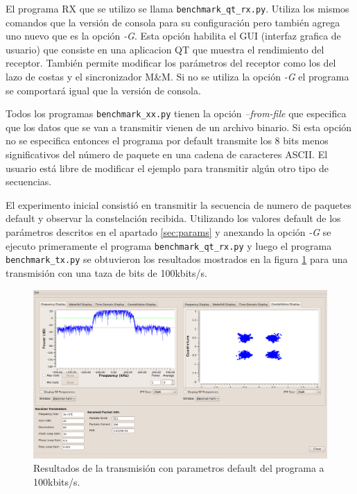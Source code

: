 El programa RX que se utilizo se llama \verb|benchmark_qt_rx.py|. Utiliza los mismos comandos que la
versi\'on de consola para su configuraci\'on pero tambi\'en agrega uno nuevo que es la opci\'on
\emph{-G}. Esta opci\'on habilita el GUI (interfaz grafica de usuario) que consiste en una
aplicacion QT que muestra el rendimiento del receptor. Tambi\'en permite modificar los par\'ametros
del receptor como los del lazo de costas y el sincronizador M\&M. Si no se utiliza la opci\'on
\emph{-G} el programa se comportar\'a igual que la versi\'on de consola.

Todos los programas \verb|benchmark_xx.py| tienen la opci\'on \emph{--from-file} que especifica que
los datos que se van a transmitir vienen de un archivo binario. Si esta opci\'on no se especifica
entonces el programa por default transmite los 8 bits menos significativos del n\'umero de paquete
en una cadena de caracteres ASCII. El usuario est\'a libre de modificar el ejemplo para transmitir
alg\'un otro tipo de secuencias.

El experimento inicial consisti\'o en transmitir la secuencia de numero de paquetes default y
observar la constelaci\'on recibida. Utilizando los valores default de los par\'ametros descritos en
el apartado \ref{sec:params} y anexando la opci\'on \emph{-G} se ejecuto primeramente el programa
\verb|benchmark_qt_rx.py| y luego el programa \verb|benchmark_tx.py| se obtuvieron los resultados
mostrados en la figura \ref{fig:dqpsktrans} para una transmisi\'on con una taza de bits de
100kbits/s.

\begin{figure}[htp]
  \centering
  \includegraphics[width=5.9in]{figs/dqpsktrans}
  \vspace{0.3in}
  \caption{Resultados de la transmisi\'on con parametros default del programa a 100kbits/s.}
  \label{fig:dqpsktrans}
\end{figure}

